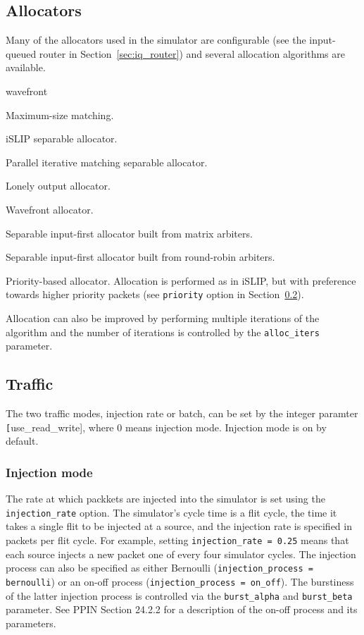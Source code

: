 \documentclass[11pt]{article}
\begin{document}
\subsection{Allocators}
\label{sec:alloc}

Many of the allocators used in the simulator are configurable (see
the input-queued router in Section~\ref{sec:iq_router}) and several
allocation algorithms are available.
\begin{opt_list}{wavefront}

\item[max\_size] Maximum-size matching. 
\item[islip] iSLIP separable allocator.
\item[pim] Parallel iterative matching separable allocator.
\item[loa] Lonely output allocator.
\item[wavefront] Wavefront allocator.
\item[matrix] Separable input-first allocator built from matrix arbiters.
\item[round\_robin] Separable input-first allocator built from round-robin arbiters.
\item[select] Priority-based allocator.  Allocation is performed as in
iSLIP, but with preference towards higher priority packets (see
\texttt{priority} option in Section~\ref{sec:traffic}).

\end{opt_list}

Allocation can also be improved by performing multiple iterations of
the algorithm and the number of iterations is controlled by the
\texttt{alloc\_iters} parameter.

\subsection{Traffic}
\label{sec:traffic}


The two traffic modes, injection rate or batch, can be set by the integer paramter \texttt[use\_read\_write], where 0 means injection mode. Injection mode is on by default.

\subsubsection{Injection mode}
The rate at which packkets are injected into the simulator is set using
the \texttt{injection\_rate} option.  The simulator's cycle time is a
flit cycle, the time it takes a single flit to be injected at a
source, and the injection rate is specified in packets per flit cycle.
For example, setting \texttt{injection\_rate = 0.25} means that each
source injects a new packet one of every four simulator cycles.  The
injection process can also be specified as either Bernoulli
(\texttt{injection\_process = bernoulli}) or an on-off process
(\texttt{injection\_process = on\_off}).  The burstiness of the latter
injection process is controlled via the \texttt{burst\_alpha} and
\texttt{burst\_beta} parameter.  See PPIN Section 24.2.2 for a
description of the on-off process and its parameters.
\end{document}

